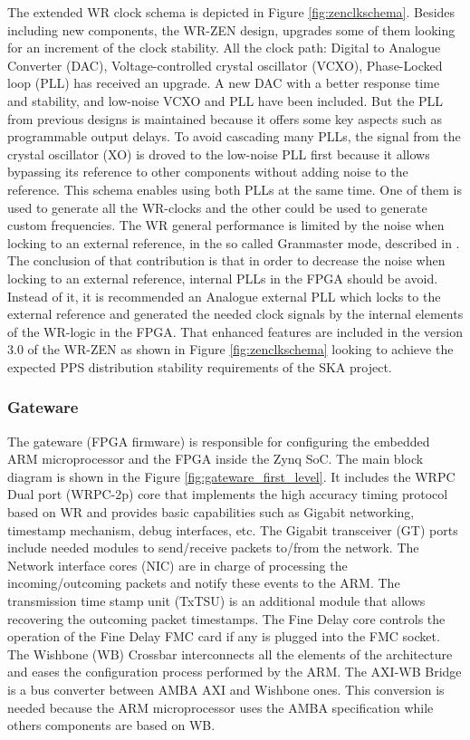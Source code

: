 The extended WR clock schema is depicted in Figure \ref{fig:zenclkschema}. 
Besides including new components, the WR-ZEN design, upgrades some of them 
looking for an increment of the clock stability. All the clock path: Digital to Analogue
Converter (DAC), Voltage-controlled crystal oscillator (VCXO), 
Phase-Locked loop (PLL) has received an upgrade. A new DAC with a better response time and 
stability, and low-noise VCXO and PLL have been included. But the PLL from 
previous designs is maintained because it offers some key aspects such as 
programmable output delays. To avoid cascading many PLLs, the signal from the 
crystal oscillator (XO) is droved to the low-noise PLL first because it allows bypassing its 
reference to other components without adding noise to the reference. This 
schema enables using both PLLs at the same time. One of them is used to 
generate all the WR-clocks and the other could be used to generate custom 
frequencies. The WR general 
performance is limited by the noise when locking to an external reference, in 
the so called Granmaster mode, described in \cite{Rizzi2016}. The conclusion of 
that contribution is that in order to decrease the noise when locking to an 
external reference, internal PLLs in the FPGA should be avoid. Instead of it, 
it is recommended an Analogue external PLL which locks to the external reference 
and generated the needed clock signals by the internal elements of the WR-logic 
in the FPGA. That enhanced features are included in the version 3.0 of the WR-ZEN as 
shown in Figure \ref{fig:zenclkschema} looking to achieve the expected PPS 
distribution stability requirements of the SKA project.


\subsubsection{Gateware}
\label{subsec:gateware}

The gateware (FPGA firmware) is responsible for configuring the embedded ARM microprocessor and the FPGA inside the Zynq SoC. The main block diagram is shown in the Figure \ref{fig:gateware_first_level}. It includes the WRPC Dual port (WRPC-2p) core that implements the high accuracy timing protocol based on WR and provides basic capabilities such as Gigabit networking, timestamp mechanism, debug interfaces, etc. The Gigabit transceiver (GT) ports include needed modules to send/receive packets to/from the network. The Network interface cores (NIC) are in charge of processing the incoming/outcoming packets and notify these events to the ARM. The transmission time stamp unit (TxTSU) is an additional module that allows recovering the outcoming packet timestamps. The Fine Delay core controls the operation of the Fine Delay FMC card if any is plugged into the FMC socket. The Wishbone (WB) Crossbar interconnects all the elements of the architecture and eases the configuration process performed by the ARM. The AXI-WB Bridge is a bus converter between AMBA AXI and Wishbone ones. This conversion is needed because the ARM microprocessor uses the AMBA specification while others components are based on WB.

